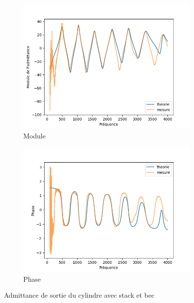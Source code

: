 \documentclass[atiam, article]{rapport} %
\begin{document}
\begin{figure}[H]
  \centering
  \begin{subfigure}[b]{.45\textwidth}
    \centering
    \includegraphics[width=\textwidth]{vents/images_vents/admittance_cylindre+stack+bec_amp.png}
    \caption{Module}
    \label{subfig:admittance_cylindre+stack+bec_amp}
  \end{subfigure}
  \begin{subfigure}[b]{.45\textwidth}
    \centering
    \includegraphics[width=\textwidth]{vents/images_vents/admittance_cylindre+stack+bec_phase.png}
    \caption{Phase}
    \label{subfig:admittance_cylindre+stack+bec_phase}
  \end{subfigure}
  \caption{Admittance de sortie du cylindre avec stack et bec}
  \label{fig:admittance}
\end{figure}
\end{document}
